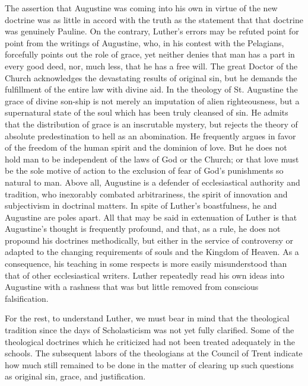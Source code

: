 The assertion that Augustine was coming into his own in virtue
of the new doctrine was as little in accord with the truth as the
statement that that doctrine was genuinely Pauline. On the contrary,
Luther’s errors may be refuted point for point from the writings
of Augustine, who, in his contest with the Pelagians, forcefully points
out the role of grace, yet neither denies that man has a part in
every good deed, nor, much less, that he has a free will. The great
Doctor of the Church acknowledges the devastating results of original
sin, but he demands the fulfillment of the entire law with divine
aid. In the theology of St. Augustine the grace of divine son-ship
is not merely an imputation of alien righteousness, but a supernatural
state of the soul which has been truly cleansed of sin. He
admits that the distribution of grace is an inscrutable mystery, but
rejects the theory of absolute predestination to hell as an abomination.
He frequently argues in favor of the freedom of the human
spirit and the dominion of love. But he does not hold man to be
independent of the laws of God or the Church; or that love must
be the sole motive of action to the exclusion of fear of God’s punishments
so natural to man. Above all, Augustine is a defender of
ecclesiastical authority and tradition, who inexorably combated
arbitrariness, the spirit of innovation and subjectivism in doctrinal
matters. In spite of Luther’s boastfulness, he and Augustine are
poles apart. All that may be said in extenuation of Luther is that
Augustine’s thought is frequently profound, and that, as a rule,
he does not propound his doctrines methodically, but either in the
service of controversy or adapted to the changing requirements of
souls and the Kingdom of Heaven. As a consequence, his teaching
in some respects is more easily misunderstood than that of other
ecclesiastical writers. Luther repeatedly read his own ideas into Augustine
with a rashness that was but little removed from conscious
falsification.

For the rest, to understand Luther, we must bear in mind that
the theological tradition since the days of Scholasticism was not yet
fully clarified. Some of the theological doctrines which he criticized
had not been treated adequately in the schools. The subsequent
labors of the theologians at the Council of Trent indicate how much
still remained to be done in the matter of clearing up such questions
as original sin, grace, and justification.


